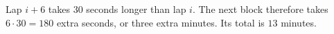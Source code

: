 Lap $i+6$ takes $30$ seconds longer than lap $i$. The next block therefore takes $6\cdot30=180$ extra seconds, or three extra minutes. Its total is $\boxed{13}$ minutes.
